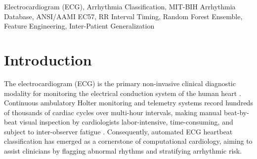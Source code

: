 \documentclass[conference]{IEEEtran}
\begin{document}
\begin{abstract}
importance analysis confirmed that the 9 timing features contributed 26.38\% of model-level split decisions despite representing only 4.31\% of the input space. These findings demonstrate that classical machine learning with domain-grounded timing features achieves competitive, interpretable diagnostic separation on the MIT-BIH benchmark without complex deep architectures, establishing an offline reference pipeline for retrospective Holter analysis. The study is an academic benchmark evaluation and does not establish prospective clinical efficacy.
\end{abstract}

\begin{IEEEkeywords}
Electrocardiogram (ECG), Arrhythmia Classification, MIT-BIH Arrhythmia Database, ANSI/AAMI EC57, RR Interval Timing, Random Forest Ensemble, Feature Engineering, Inter-Patient Generalization
\end{IEEEkeywords}

\section{Introduction}
The electrocardiogram (ECG) is the primary non-invasive clinical diagnostic modality for monitoring the electrical conduction system of the human heart \cite{sornmo2005bioelectrical}. Continuous ambulatory Holter monitoring and telemetry systems record hundreds of thousands of cardiac cycles over multi-hour intervals, making manual beat-by-beat visual inspection by cardiologists labor-intensive, time-consuming, and subject to inter-observer fatigue \cite{mark1982annotated}. Consequently, automated ECG heartbeat classification has emerged as a cornerstone of computational cardiology, aiming to assist clinicians by flagging abnormal rhythms and stratifying arrhythmic risk.
\end{document}
